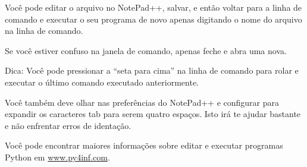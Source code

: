 Você pode editar o arquivo no NotePad++, salvar, e então voltar para
a linha de comando e executar o seu programa de novo apenas digitando
o nome do arquivo na linha de comando.
%

Se você estiver confuso na janela de comando, apenas feche e abra
uma nova.
%

Dica: Você pode pressionar a ``seta para cima'' na linha de comando
para rolar e executar o último comando executado anteriormente.
%

Você também deve olhar nas preferências do NotePad++ e configurar
para expandir os caracteres tab para serem quatro espaços. Isto irá
te ajudar bastante e não enfrentar erros de identação.
%

Você pode encontrar maiores informações sobre editar e executar
programas Python em \url{www.py4inf.com}.
